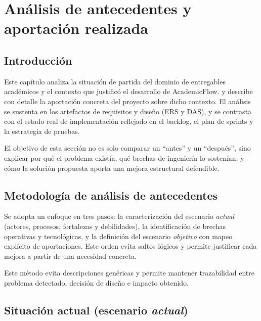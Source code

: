 \chapter{An\'alisis de antecedentes y aportaci\'on realizada}\label{analanteced}
\makeatletter
{}
\makeatother

\FloatBarrier
\section{Introducci\'on}

Este cap\'itulo analiza la situaci\'on de partida del dominio de entregables acad\'emicos y el contexto que justific\'o el desarrollo de AcademicFlow.
y describe con detalle la aportaci\'on concreta del proyecto sobre dicho contexto.
El an\'alisis se sustenta en los artefactos de requisitos y dise\~no (ERS y DAS),
y se contrasta con el estado real de implementaci\'on reflejado en el backlog,
el plan de sprints y la estrategia de pruebas.

El objetivo de esta secci\'on no es solo comparar un ``antes'' y un ``despu\'es'',
sino explicar por qu\'e el problema exist\'ia,
qu\'e brechas de ingenier\'ia lo sosten\'ian,
y c\'omo la soluci\'on propuesta aporta una mejora estructural defendible.

\FloatBarrier
\section{Metodolog\'ia de an\'alisis de antecedentes}

Se adopta un enfoque en tres pasos: la caracterizaci\'on del escenario \emph{actual} (actores, procesos, fortalezas y debilidades), la identificaci\'on de brechas operativas y tecnol\'ogicas, y la definici\'on del escenario \emph{objetivo} con mapeo expl\'icito de aportaciones. Este orden evita saltos l\'ogicos y permite justificar cada mejora a partir de una necesidad concreta.

Este m\'etodo evita descripciones gen\'ericas y permite mantener trazabilidad
entre problema detectado, decisi\'on de dise\~no e impacto obtenido.

\FloatBarrier
\section{Situaci\'on actual (escenario \emph{actual})}

